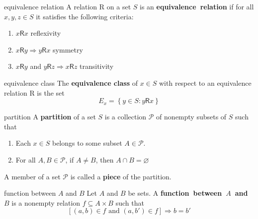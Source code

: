 \documentclass[avery5371,grid]{flashcards}
\begin{document}
\begin{flashcard}[Definition]{equivalence relation}
A relation \textsf{R} on a set $S$ is an \mbox{\textbf{equivalence relation}}
if for all $x, y, z \in S$ it satisfies the following criteria:
\begin{enumerate}
\item $x \textsf{R} x$ reflexivity
\item $x \textsf{R} y \Rightarrow y \textsf{R} x$ symmetry
\item $x \textsf{R} y$ and $y \textsf{R} z \Rightarrow
x \textsf{R} z$ transitivity
\end{enumerate}
\end{flashcard}

\begin{flashcard}[Definition]{equivalence class}
The \textbf{equivalence class} of $x \in S$ with respect to an equivalence 
relation \textsf{R} is the set
\begin{equation*}
E_{x} = \left\lbrace y \in S : y \textsf{R} x\right\rbrace 
\end{equation*}
\end{flashcard}

\begin{flashcard}[Theorem]{partition}
A \textbf{partition} of a set $S$ is a collection $\mathscr{P}$
of nonempty subsets of $S$ such that
\begin{enumerate}
\item Each $x \in S$ belongs to some subset $A \in \mathscr{P}$.
\item For all $A, B \in \mathscr{P}$, if $A \neq B$,
then $A \cap B = \varnothing$
\end{enumerate}
A member of a set $\mathscr{P}$ is called a \textbf{piece} of the partition.
\end{flashcard}


\begin{flashcard}[Definition]{function between $A$ and $B$}
Let $A$ and $B$ be sets.  A \mbox{\textbf{function between $A$ and $B$}}
is a nonempty relation $f \subseteq A \times B$ such that
\begin{equation*}
\left[ (a,b) \in f \textrm{ and } (a,b') \in f \right] \Longrightarrow b=b'
\end{equation*}
\end{flashcard}
\end{document}
